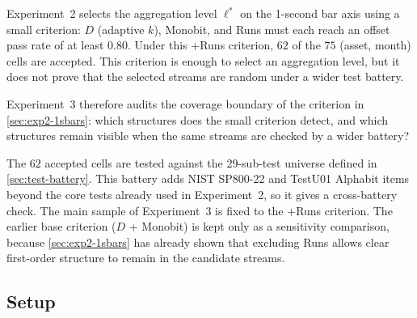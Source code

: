 \documentclass[11pt,titlepage,openany,oneside]{book}  %
\begin{document}
Experiment~2 selects the aggregation level $\ell^*$ on the 1-second bar axis using a small criterion: $D$ (adaptive $k$), Monobit, and Runs must each reach an offset pass rate of at least $0.80$. Under this +Runs criterion, $62$ of the $75$ (asset, month) cells are accepted. This criterion is enough to select an aggregation level, but it does not prove that the selected streams are random under a wider test battery.

Experiment~3 therefore audits the coverage boundary of the criterion in \cref{sec:exp2-1sbars}: which structures does the small criterion detect, and which structures remain visible when the same streams are checked by a wider battery?

The $62$ accepted cells are tested against the 29-sub-test universe defined in \cref{sec:test-battery}. This battery adds NIST SP800-22 and TestU01 Alphabit items beyond the core tests already used in Experiment~2, so it gives a cross-battery check. The main sample of Experiment~3 is fixed to the +Runs criterion. The earlier base criterion ($D$ + Monobit) is kept only as a sensitivity comparison, because \cref{sec:exp2-1sbars} has already shown that excluding Runs allows clear first-order structure to remain in the candidate streams.

\subsection{Setup}
\label{sec:exp3-setup}
\end{document}
